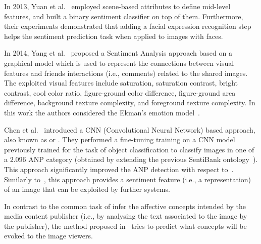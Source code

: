 In 2013, Yuan et al.~\cite{yuan2013sentribute} employed scene-based attributes to define mid-level features, and built a binary sentiment classifier on top of them. 
Furthermore, their experiments demonstrated that adding a facial expression recognition step helps the sentiment prediction task when applied to images with faces.

In 2014, Yang et al.~\cite{yang2014your} proposed a Sentiment Analysis approach based on a graphical model which is used to represent the connections between visual features and friends interactions (i.e., comments) related to the shared images.
The exploited visual features include saturation, saturation contrast, bright contrast, cool color ratio, figure-ground color difference, figure-ground area difference, background texture complexity, and foreground texture complexity. In this work the authors considered the Ekman's emotion model~\cite{ekman1987universals}.

Chen et al.~\cite{chen2014deepsentibank} introduced a CNN (Convolutional Neural Network) based approach, also known as  or . They performed a fine-tuning training on a CNN model previously trained for the task of object classification to classify images in one of a 2.096 ANP category (obtained by extending the previous SentiBank ontology~\cite{borth2013large}). This approach significantly improved the ANP detection with respect to~\cite{borth2013large}. Similarly to~\cite{borth2013large}, this approach provides a sentiment feature (i.e., a representation) of an image that can be exploited by further systems.

In contrast to the common task of infer the affective concepts intended by the media content publisher (i.e., by analysing the text associated to the image by the publisher), the method proposed in~\cite{chen2014predicting} tries to predict what concepts will be evoked to the image viewers.

